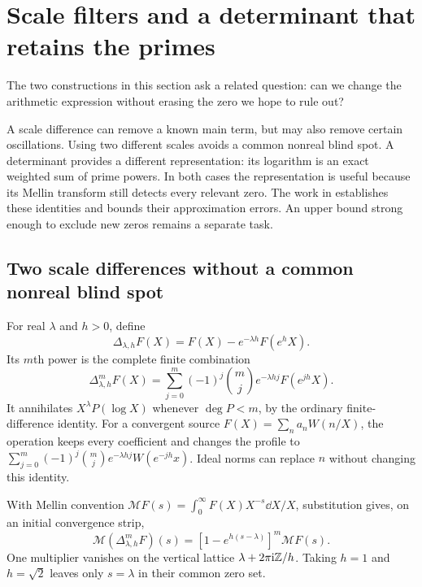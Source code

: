 \section{Scale filters and a determinant that retains the primes}\label{sec:detectors}

The two constructions in this section ask a related question: can we change the arithmetic expression without erasing the zero we hope to rule out?

A scale difference can remove a known main term, but may also remove certain oscillations. Using two different scales avoids a common nonreal blind spot. A determinant provides a different representation: its logarithm is an exact weighted sum of prime powers. In both cases the representation is useful because its Mellin transform still detects every relevant zero. The work in \cite{R993,R1000,R1002} establishes these identities and bounds their approximation errors. An upper bound strong enough to exclude new zeros remains a separate task.

\subsection{Two scale differences without a common nonreal blind spot}
For real $\lambda$ and $h>0$, define
\[
 \Delta_{\lambda,h}F(X)=F(X)-e^{-\lambda h}F(e^hX).
\]
Its $m$th power is the complete finite combination
\begin{equation}\label{eq:scale-difference}
 \Delta_{\lambda,h}^mF(X)=\sum_{j=0}^m(-1)^j\binom mj
                                   e^{-\lambda hj}F(e^{jh}X).
\end{equation}
It annihilates $X^\lambda P(\log X)$ whenever $\deg P<m$, by the ordinary finite-difference identity. For a convergent source $F(X)=\sum_n a_nW(n/X)$, the operation keeps every coefficient and changes the profile to
$\sum_{j=0}^m(-1)^j\binom mj e^{-\lambda hj}W(e^{-jh}x)$. Ideal norms can replace $n$ without changing this identity.

With Mellin convention $\mathcal MF(s)=\int_0^\infty F(X)X^{-s}\dd X/X$, substitution gives, on an initial convergence strip,
\begin{equation}\label{eq:notch-multiplier}
 \mathcal M(\Delta_{\lambda,h}^mF)(s)
 =[1-e^{h(s-\lambda)}]^m\mathcal MF(s).
\end{equation}
One multiplier vanishes on the vertical lattice $\lambda+2\pi\mathrm i\mathbb Z/h$. Taking $h=1$ and $h=\sqrt2$ leaves only $s=\lambda$ in their common zero set.

